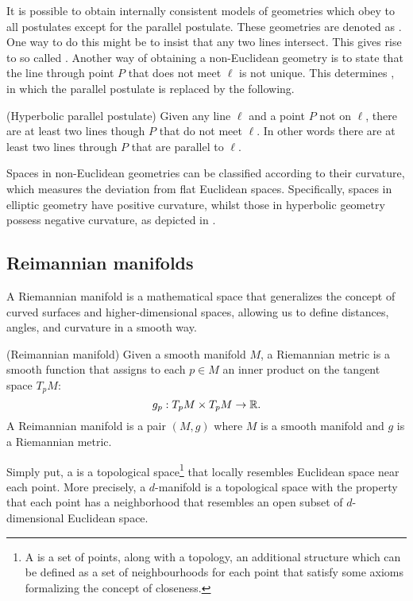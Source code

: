 It is possible to obtain internally consistent models of geometries which obey to all postulates except for the parallel postulate. These geometries are denoted as . One way to do this might be to insist that any two lines intersect. This gives rise to so called . Another way of obtaining a non-Euclidean geometry is to state that the line through point $P$ that does not meet $\ell$ is not unique. This determines , in which the parallel postulate is replaced by the following.


\begin{postulate}(Hyperbolic parallel postulate)
    Given any line $\ell$ and a point $P$ not on $\ell$, there are at least two lines though $P$ that do not meet $\ell$. In other words there are at least two lines through $P$ that are parallel to $\ell$.
\end{postulate}



Spaces in non-Euclidean geometries can be classified according to their curvature, which measures the deviation from flat Euclidean spaces. Specifically, spaces in elliptic geometry have positive curvature, whilst those in hyperbolic geometry possess negative curvature, as depicted in . 

\subsection{Reimannian manifolds}
A Riemannian manifold is a mathematical space that generalizes the concept of curved surfaces and higher-dimensional spaces, allowing us to define distances, angles, and curvature in a smooth way. 


\begin{definition} (Reimannian manifold)
Given a smooth manifold $M$, a Riemannian metric is a smooth function that assigns to each $p \in M$ an inner product on the tangent space $T_pM$:
\begin{equation*}
    g_p: T_pM \times T_pM \to \mathbb{R}.
\end{equation*}
    A Reimannian manifold is a pair $(M,g)$ where $M$ is a smooth manifold and $g$ is a Riemannian metric.
\end{definition}

Simply put, a  is a topological space\footnote{A  is a set of points, along with a topology, an additional structure which can be defined as a set of neighbourhoods for each point that satisfy some axioms formalizing the concept of closeness.} that locally resembles Euclidean space near each point. More precisely, a $d$-manifold  is a topological space with the property that each point has a neighborhood that resembles an open subset of $d$-dimensional Euclidean space. 

